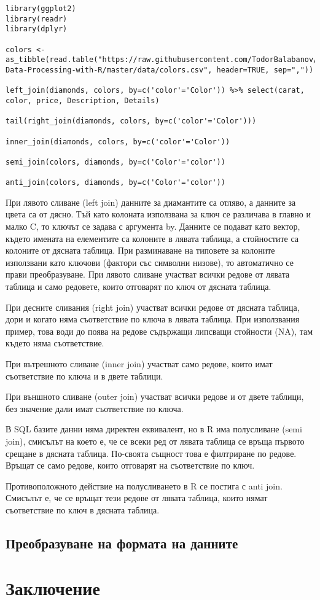 \begin{lstlisting}[caption=Сложни сливания, label=listing0141]
library(ggplot2)
library(readr)
library(dplyr)

colors <- as_tibble(read.table("https://raw.githubusercontent.com/TodorBalabanov/Statistical-Data-Processing-with-R/master/data/colors.csv", header=TRUE, sep=","))

left_join(diamonds, colors, by=c('color'='Color')) %>% select(carat, color, price, Description, Details)

tail(right_join(diamonds, colors, by=c('color'='Color')))

inner_join(diamonds, colors, by=c('color'='Color'))

semi_join(colors, diamonds, by=c('Color'='color'))

anti_join(colors, diamonds, by=c('Color'='color'))
\end{lstlisting}

При лявото сливане (left join) данните за диамантите са отляво, а данните за цвета са от дясно. Тъй като колоната използвана за ключ се различава в главно и малко C, то ключът се задава с аргумента by. Данните се подават като вектор, където имената на елементите са колоните в лявата таблица, а стойностите са колоните от дясната таблица. При разминаване на типовете за колоните използвани като ключови (фактори със символни низове), то автоматично се прави преобразуване. При лявото сливане участват всички редове от лявата таблица и само редовете, които отговарят по ключ от дясната таблица. 

При десните сливания (right join) участват всички редове от дясната таблица, дори и когато няма съответствие по ключа в лявата таблица. При използвания пример, това води до поява на редове съдържащи липсващи стойности (NA), там където няма съответствие.

При вътрешното сливане (inner join) участват само редове, които имат съответствие по ключа и в двете таблици. 

При външното сливане (outer join) участват всички редове и от двете таблици, без значение дали имат съответствие по ключа.

В SQL базите данни няма директен еквивалент, но в R има полусливане (semi join), смисълът на което е, че се всеки ред от лявата таблица се връща първото срещане в дясната таблица. По-своята същност това е филтриране по редове. Връщат се само редове, които отговарят на съответствие по ключ. 

Противоположното действие на полусливането в R се постига с anti join. Смисълът е, че се връщат тези редове от лявата таблица, които нямат съответствие по ключ в дясната таблица. 

\subsection{Преобразуване на формата на данните}



\section*{Заключение}

